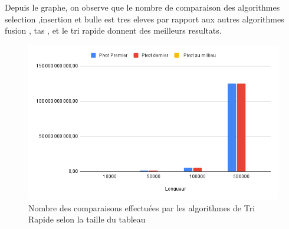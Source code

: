\par
Depuis le graphe, on observe que le nombre de comparaison des algorithmes selection ,insertion et bulle est tres eleves par rapport aux autres algorithmes fusion , tas , et le tri rapide donnent des meilleurs resultats. 
\par
\begin{figure}[H]
    \centering
        \includegraphics[scale=0.7]{ressources/nb_inv.png}
        \caption{Nombre des comparaisons effectuées par les  algorithmes de Tri Rapide selon la taille du tableau}
    \label{fig:temps_exec_dico_theo}
\end{figure} 
\par
